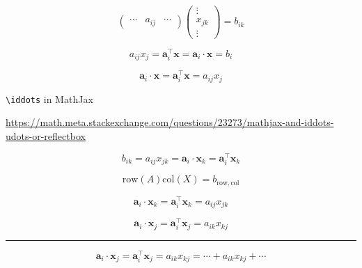 \documentclass[
]{book}
\theoremstyle{definition}
\theoremstyle{definition}
\theoremstyle{definition}
\theoremstyle{definition}
\theoremstyle{remark}
\begin{document}
\[
\begin{pmatrix}\cdots & a_{{\scriptscriptstyle ij}} & \cdots\end{pmatrix}\begin{pmatrix}\vdots\\
x_{{\scriptscriptstyle jk}}\\
\vdots
\end{pmatrix}=b_{{\scriptscriptstyle ik}}
\]

\[
a_{{\scriptscriptstyle ij}}x_{{\scriptscriptstyle j}}=\boldsymbol{a}_{{\scriptscriptstyle i}}^{\intercal}\boldsymbol{x}=\boldsymbol{a}_{{\scriptscriptstyle i}}\cdot\boldsymbol{x}=b_{i}
\]

\[
\boldsymbol{a}_{{\scriptscriptstyle i}}\cdot\boldsymbol{x}=\boldsymbol{a}_{{\scriptscriptstyle i}}^{\intercal}\boldsymbol{x}=a_{{\scriptscriptstyle ij}}x_{{\scriptscriptstyle j}}
\]

\texttt{\textbackslash{}iddots} in MathJax

\url{https://math.meta.stackexchange.com/questions/23273/mathjax-and-iddots-udots-or-reflectbox}

\[
b_{{\scriptscriptstyle ik}}=a_{{\scriptscriptstyle ij}}x_{{\scriptscriptstyle jk}}=\boldsymbol{a}_{{\scriptscriptstyle i}}\cdot\boldsymbol{x}_{{\scriptscriptstyle k}}=\boldsymbol{a}_{{\scriptscriptstyle i}}^{\intercal}\boldsymbol{x}_{{\scriptscriptstyle k}}
\]

\[
\mathrm{row}\left(A\right)\mathrm{col}\left(X\right)=b_{\mathrm{row},\mathrm{col}}
\]

\[
\boldsymbol{a}_{{\scriptscriptstyle i}}\cdot\boldsymbol{x}_{{\scriptscriptstyle k}}=\boldsymbol{a}_{{\scriptscriptstyle i}}^{\intercal}\boldsymbol{x}_{{\scriptscriptstyle k}}=a_{{\scriptscriptstyle ij}}x_{{\scriptscriptstyle jk}}
\]

\[
\boldsymbol{a}_{{\scriptscriptstyle i}}\cdot\boldsymbol{x}_{{\scriptscriptstyle j}}=\boldsymbol{a}_{{\scriptscriptstyle i}}^{\intercal}\boldsymbol{x}_{{\scriptscriptstyle j}}=a_{{\scriptscriptstyle ik}}x_{{\scriptscriptstyle kj}}
\]

\begin{center}\rule{0.5\linewidth}{0.5pt}\end{center}

\[
\boldsymbol{a}_{{\scriptscriptstyle i}}\cdot\boldsymbol{x}_{{\scriptscriptstyle j}}=\boldsymbol{a}_{{\scriptscriptstyle i}}^{\intercal}\boldsymbol{x}_{{\scriptscriptstyle j}}=a_{{\scriptscriptstyle ik}}x_{{\scriptscriptstyle kj}}=\cdots+a_{{\scriptscriptstyle ik}}x_{{\scriptscriptstyle kj}}+\cdots
\]
\end{document}
